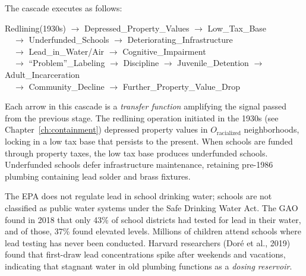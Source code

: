 The cascade executes as follows:

\begin{center}
\begin{tcolorbox}[colback=black!3, colframe=black!70, arc=2pt, boxrule=0.6pt, width=0.95\linewidth]
\small
\ttfamily
Redlining(1930s) $\rightarrow$ Depressed\_Property\_Values $\rightarrow$ Low\_Tax\_Base
\\[2pt]
$\quad\rightarrow$ Underfunded\_Schools $\rightarrow$ Deteriorating\_Infrastructure
\\[2pt]
$\quad\rightarrow$ Lead\_in\_Water/Air $\rightarrow$ Cognitive\_Impairment
\\[2pt]
$\quad\rightarrow$ ``Problem''\_Labeling $\rightarrow$ Discipline $\rightarrow$ Juvenile\_Detention $\rightarrow$ Adult\_Incarceration
\\[2pt]
$\quad\rightarrow$ Community\_Decline $\rightarrow$ Further\_Property\_Value\_Drop
\end{tcolorbox}
\end{center}

Each arrow in this cascade is a \textit{transfer function} amplifying the signal passed from the previous stage. The redlining operation initiated in the 1930s (see Chapter~\ref{ch:containment}) depressed property values in $O_{\text{racialized}}$ neighborhoods, locking in a low tax base that persists to the present. When schools are funded through property taxes, the low tax base produces underfunded schools. Underfunded schools defer infrastructure maintenance, retaining pre-1986 plumbing containing lead solder and brass fixtures.

The EPA does not regulate lead in school drinking water; schools are not classified as public water systems under the Safe Drinking Water Act. The GAO found in 2018 that only 43\% of school districts had tested for lead in their water, and of those, 37\% found elevated levels. Millions of children attend schools where lead testing has never been conducted. Harvard researchers (Dor\'{e} et al., 2019) found that first-draw lead concentrations spike after weekends and vacations, indicating that stagnant water in old plumbing functions as a \textit{dosing reservoir}.

